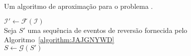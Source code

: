 \begin{algorithm}[!tbh]
  \caption{Um algoritmo de aproximação para o problema \SbIRMI{}.\label{algorithm:QMGGIVXT}}
  $\mathcal{I'} \gets \mathcal{F}(\mathcal{I})$ \\
  Seja $S'$ uma sequência de eventos de reversão fornecida pelo Algoritmo~\ref{algorithm:JAJGNYWD} \\
  $S\gets \mathcal{G}(S')$ \\
\end{algorithm}